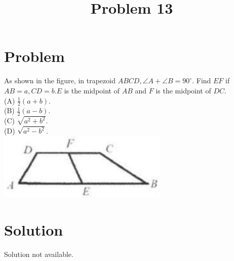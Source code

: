 \documentclass{article}
\title{Problem 13}
\date{}
\begin{document}
\maketitle

\section*{Problem}
As shown in the figure, in trapezoid \(A B C D, \angle A+\angle B=90^{\circ}\). Find \(E F\) if \(A B=a, C D=b . E\) is the midpoint of \(A B\) and \(F\) is the midpoint of \(D C\).\\
(A) \(\frac{1}{2}(a+b)\).\\
(B) \(\frac{1}{2}(a-b)\).\\
(C) \(\sqrt{a^{2}+b^{2}}\).\\
(D) \(\sqrt{a^{2}-b^{2}}\).\\
\centering
\includegraphics[width=\textwidth]{images/128(4).jpg}

\section*{Solution}
Solution not available.
\end{document}
